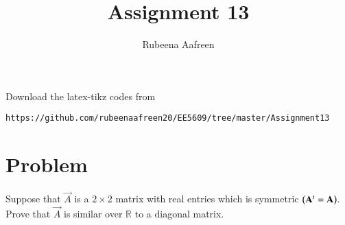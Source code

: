\documentclass[journal,12pt]{IEEEtran}
\begin{document}
     \def\rightbox#1{\makebox[0in][r]{#1}}
     \def\centbox#1{\makebox[0in]{#1}}
     \def\topbox#1{\raisebox{-\baselineskip}[0in][0in]{#1}}
     \def\midbox#1{\raisebox{-0.5\baselineskip}[0in][0in]{#1}}
\vspace{3cm}
\title{Assignment 13}
\author{Rubeena Aafreen}
\maketitle
\bigskip
\renewcommand{\thefigure}{\theenumi}
\renewcommand{\thetable}{\theenumi}
%
Download the latex-tikz codes from 
%
\begin{lstlisting}
https://github.com/rubeenaafreen20/EE5609/tree/master/Assignment13
\end{lstlisting}
\section{\textbf{Problem}}
%
Suppose that $\vec{A}$ is a $2\times2$ matrix with real entries which is symmetric $\left(\mathbf{A}^t=\mathbf{A}\right)$.
Prove that $\vec{A}$ is similar over $\mathbb{R}$ to a diagonal matrix. 
\end{document}
